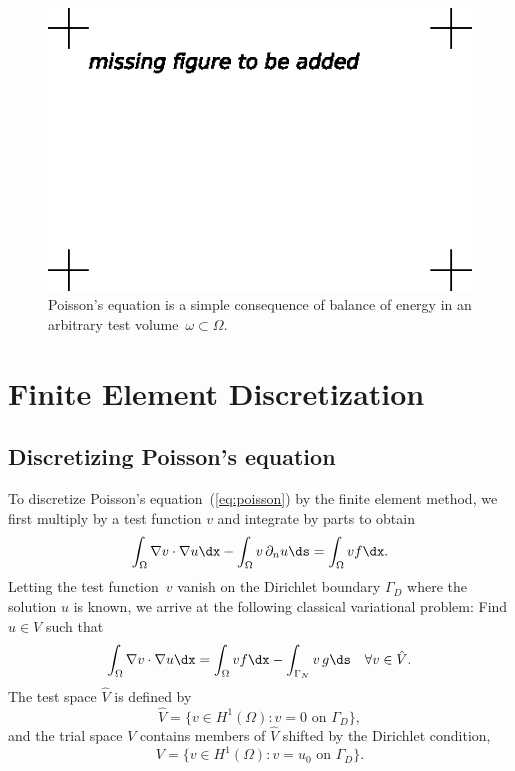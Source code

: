 \begin{figure}
  \begin{center}
    \includegraphics[width=\largewidth]{chapters/kirby-7/eps/missing-figure.eps}
    \caption{Poisson's equation is a simple consequence of balance of
      energy in an arbitrary test volume~$\omega \subset \Omega$.}
  \end{center}
\end{figure}

\section{Finite Element Discretization}

\subsection{Discretizing Poisson's equation}

To discretize Poisson's equation~(\ref{eq:poisson}) by the finite
element method, we first multiply by a test function $v$ and integrate
by parts to obtain
\begin{displaymath}
  \int_{\Omega} \nabla v \cdot \nabla u \dx
  - \int_{\Omega} v \, \partial_n u \ds
  =
  \int_{\Omega} v f \dx.
\end{displaymath}
Letting the test function~$v$ vanish on the Dirichlet boundary
$\Gamma_D$ where the solution $u$ is known, we arrive at the following
classical variational problem: Find $u \in V$ such that
\begin{equation} \label{eq:poisson,varproblem}
  \int_{\Omega} \nabla v \cdot \nabla u \dx =
  \int_{\Omega} v f \dx - \int_{\Gamma_N} v \, g \ds
  \quad \forall v \in \hat{V}.
\end{equation}
The test space $\hat{V}$ is defined by
\begin{displaymath}
  \hat{V} = \{v \in H^1(\Omega) : v = 0 \mbox{ on } \Gamma_D\},
\end{displaymath}
and the trial space \( V \) contains members of \( \hat{V} \) shifted
by the Dirichlet condition,
\begin{displaymath}
  V = \{ v \in H^1(\Omega) : v = u_0 \mbox{ on } \Gamma_D \}.
\end{displaymath}

